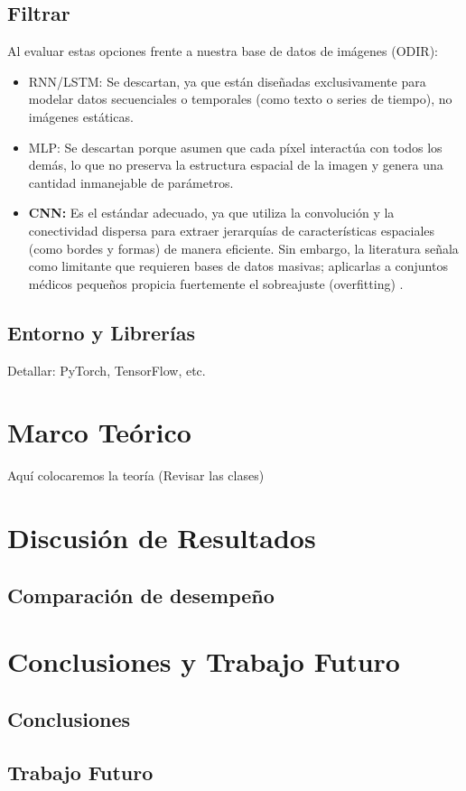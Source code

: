 \documentclass[12pt, a4paper]{article}
\begin{document}
\subsection{Filtrar}

Al evaluar estas opciones frente a nuestra base de datos de imágenes (ODIR):

\begin{itemize}
    \item RNN/LSTM: Se descartan, ya que están diseñadas exclusivamente para modelar datos secuenciales o temporales (como texto o series de tiempo), no imágenes estáticas.
    
    \item MLP: Se descartan porque asumen que cada píxel interactúa con todos los demás, lo que no preserva la estructura espacial de la imagen y genera una cantidad inmanejable de parámetros.
    
    \item \textbf{CNN:} Es el estándar adecuado, ya que utiliza la convolución y la conectividad dispersa para extraer jerarquías de características espaciales (como bordes y formas) de manera eficiente. Sin embargo, la literatura señala como limitante que requieren bases de datos masivas; aplicarlas a conjuntos médicos pequeños propicia fuertemente el sobreajuste (overfitting)
.
\end{itemize}





\subsection{Entorno y Librerías}
Detallar: PyTorch, TensorFlow, etc.

\section{Marco Teórico}
Aquí colocaremos la teoría (Revisar las clases)



\section{Discusión de Resultados}
\subsection{Comparación de desempeño}


\section{Conclusiones y Trabajo Futuro}
\subsection{Conclusiones}
\subsection{Trabajo Futuro}

\newpage
\printbibliography[heading=bibintoc, title={Referencias}]
\end{document}
